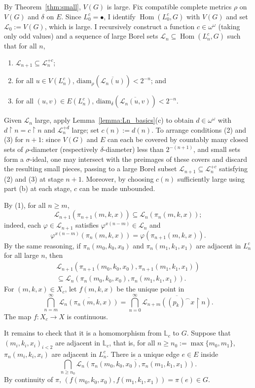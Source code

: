 \documentclass[11pt]{article}
\theoremstyle{plain}
\theoremstyle{definition}
\theoremstyle{remark}
\DeclareMathOperator{\Hom}{Hom}
\begin{document}
By Theorem~\ref{thm:small}, $V(G)$ is large.
Fix compatible complete metrics $\rho$ on $V(G)$ and $\delta$ on $E$.
Since $L^c_0=\bullet$, I identify $\Hom(L^c_0,G)$ with $V(G)$ and set $\mathcal L_0:=V(G)$, which is large.
I recursively construct a function $c\in\omega^\omega$ (taking only odd values) and a sequence of large Borel sets $\mathcal L_n\subseteq\Hom(L^c_n, G)$ such that for all $n$,

\begin{enumerate}
    \item $\mathcal L_{n+1}\subseteq\mathcal L_n^{+c}$;
    \item for all $u\in V(L^c_n)$, $\mathrm{diam}_\rho(\overline{\mathcal L_n(u)})< 2^{-n}$; and
    \item for all $(u,v)\in E(L^c_n)$, $\mathrm{diam}_\delta(\overline{\mathcal L_n(u,v)})< 2^{-n}$.
\end{enumerate}

Given $\mathcal L_n$ large, apply Lemma~\ref{lemma:Ln_basics}(c) to obtain $d\in\omega^\omega$ with $d\restriction n=c\restriction n$ and $\mathcal L_n^{+d}$ large; set $c(n):=d(n)$.
To arrange conditions (2) and (3) for $n+1$: since $V(G)$ and $E$ can each be covered by countably many closed sets of $\rho$-diameter (respectively $\delta$-diameter) less than $2^{-(n+1)}$, and small sets form a $\sigma$-ideal, one may intersect with the preimages of these covers and discard the resulting small pieces, passing to a large Borel subset $\mathcal L_{n+1}\subseteq\mathcal L_n^{+c}$ satisfying (2) and (3) at stage $n+1$.
Moreover, by choosing $c(n)$ sufficiently large using part (b) at each stage, $c$ can be made unbounded.

By (1), for all $n\geq m$, $$\mathcal L_{n+1}(\pi_{n+1}(m,k,x))\subseteq\mathcal L_n(\pi_n(m,k,x));$$ indeed, each $\varphi\in\mathcal L_{n+1}$ satisfies $\varphi^{x(n-m)}\in\mathcal L_n$ and $$\varphi^{x(n-m)}(\pi_n(m,k,x))=\varphi(\pi_{n+1}(m,k,x)).$$
By the same reasoning, if $\pi_n(m_0,k_0,x_0)$ and $\pi_n(m_1,k_1,x_1)$ are adjacent in $L^c_n$ for all large $n$, then \begin{align*}
    \mathcal L_{n+1}(\pi_{n+1}(m_0,k_0,x_0),\pi_{n+1}(m_1,k_1,x_1))\\
    \subseteq\mathcal L_n(\pi_n(m_0,k_0,x_0),\pi_n(m_1,k_1,x_1)).
\end{align*}
For $(m,k,x)\in X_c$, let $f(m,k,x)$ be the unique point in $$\bigcap_{n=m}^\infty\overline{\mathcal L_n(\pi_n(m,k,x))}=\bigcap_{n=0}^\infty\overline{\mathcal L_{n+m}((p_k)^\frown x\restriction n)}.$$
The map $f\colon X_c\to X$ is continuous.

It remains to check that it is a homomorphism from $\mathbb L_c$ to $G$.
Suppose that $(m_i,k_i,x_i)_{i<2}$ are adjacent in $\mathbb L_c$, that is, for all $n\geq n_0:=\max\{m_0,m_1\}$, $\pi_n(m_i,k_i,x_i)$ are adjacent in $L_n^c$.
There is a unique edge $e\in E$ inside $$\bigcap_{n\geq n_0}\overline{\mathcal L_n(\pi_n(m_0,k_0,x_0),\pi_n(m_1,k_1,x_1))}.$$
By continuity of $\pi$, $(f(m_0,k_0,x_0),f(m_1,k_1,x_1))=\pi(e)\in G$.

\nocite{*}


\end{document}
